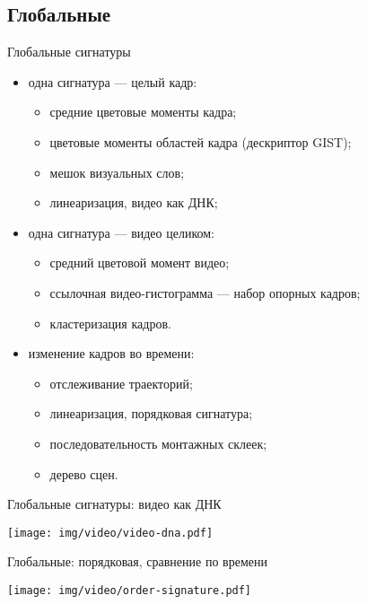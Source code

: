 

\subsection{Глобальные}

\begin{frame}{Глобальные сигнатуры}

    \begin{itemize}
        \item одна сигнатура — целый кадр:
        \begin{itemize}
            \item  средние цветовые моменты кадра;
            \item  цветовые моменты областей кадра (дескриптор GIST);
            \item  мешок визуальных слов;
            \item  линеаризация, видео как ДНК;
        \end{itemize}
        \item одна сигнатура — видео целиком:
        \begin{itemize}
            \item   средний цветовой момент видео;
            \item   ссылочная видео-гистограмма — набор опорных кадров;
            \item   кластеризация кадров.
        \end{itemize}
        \item изменение кадров во времени:
        \begin{itemize}
            \item   отслеживание траекторий;
            \item   линеаризация, порядковая сигнатура;
            \item   последовательность монтажных склеек;
            \item   дерево сцен.
        \end{itemize}
    \end{itemize}

\end{frame}

\begin{frame}{Глобальные сигнатуры: видео как ДНК}
    \begin{center}
        \texttt{[image: img/video/video-dna.pdf]}
    \end{center}
\end{frame}


\begin{frame}{Глобальные: порядковая, сравнение по времени}
    \begin{center}
        \texttt{[image: img/video/order-signature.pdf]}
    \end{center}
\end{frame}


